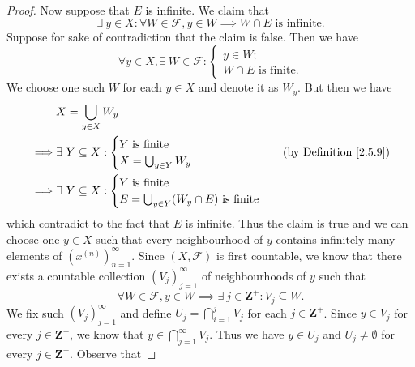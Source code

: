 \begin{proof}
    Now suppose that \(E\) is infinite.
    We claim that
    \[
        \exists\ y \in X : \forall W \in \mathcal{F}, y \in W \implies W \cap E \text{ is infinite}.
    \]
    Suppose for sake of contradiction that the claim is false.
    Then we have
    \[
        \forall y \in X, \exists\ W \in \mathcal{F} : \begin{cases}
            y \in W; \\
            W \cap E \text{ is finite}.
        \end{cases}
    \]
    We choose one such \(W\) for each \(y \in X\) and denote it as \(W_y\).
    But then we have
    \begin{align*}
                 & X = \bigcup_{y \in X} W_y                                                               \\
        \implies & \exists\ Y \subseteq X : \begin{cases}
                                                Y \text{ is finite} \\
                                                X = \bigcup_{y \in Y} W_y
                                            \end{cases}               & \text{(by Definition \ref{2.5.9})} \\
        \implies & \exists\ Y \subseteq X : \begin{cases}
                                                Y \text{ is finite} \\
                                                E = \bigcup_{y \in Y} (W_y \cap E) \text{ is finite}
                                            \end{cases}
    \end{align*}
    which contradict to the fact that \(E\) is infinite.
    Thus the claim is true and we can choose one \(y \in X\) such that every neighbourhood of \(y\) contains infinitely many elements of \((x^{(n)})_{n = 1}^\infty\).
    Since \((X, \mathcal{F})\) is first countable, we know that there exists a countable collection \((V_j)_{j = 1}^\infty\) of neighbourhoods of \(y\) such that
    \[
        \forall W \in \mathcal{F}, y \in W \implies \exists\ j \in \mathbf{Z}^+ : V_j \subseteq W.
    \]
    We fix such \((V_j)_{j = 1}^\infty\) and define \(U_j = \bigcap_{i = 1}^j V_j\) for each \(j \in \mathbf{Z}^+\).
    Since \(y \in V_j\) for every \(j \in \mathbf{Z}^+\), we know that \(y \in \bigcap_{j = 1}^\infty V_j\).
    Thus we have \(y \in U_j\) and \(U_j \neq \emptyset\) for every \(j \in \mathbf{Z}^+\).
    Observe that

\end{proof}
